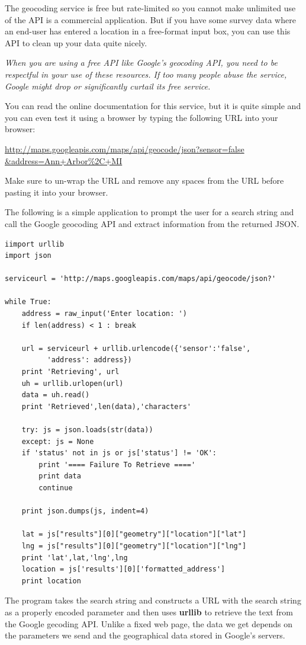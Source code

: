 \documentclass[11pt]{book}
\begin{document}
The geocoding service is free but rate-limited so you cannot make unlimited
use of the API is a commercial application.   But if you have some survey data
where an end-user has entered a location in a free-format input box, you can use
this API to clean up your data quite nicely.  

{\em When you are using a free API like Google's geocoding API, you need
to be respectful in your use of these resources.  If too many people abuse the
service, Google might drop or significantly curtail its free service.}

You can read the online documentation for this service, but it is quite simple
and you can even test it using a browser by typing the following URL into your 
browser:

\url{http://maps.googleapis.com/maps/api/geocode/json?sensor=false &address=Ann+Arbor%2C+MI}

Make sure to un-wrap the URL and remove any spaces from the URL before pasting
it into your browser.

The following is a simple application to prompt the user for a search string
and call the Google geocoding API and extract information from the returned
JSON.

\beforeverb
\begin{verbatim}
iimport urllib
import json

serviceurl = 'http://maps.googleapis.com/maps/api/geocode/json?'

while True:
    address = raw_input('Enter location: ')
    if len(address) < 1 : break

    url = serviceurl + urllib.urlencode({'sensor':'false', 
          'address': address})
    print 'Retrieving', url
    uh = urllib.urlopen(url)
    data = uh.read()
    print 'Retrieved',len(data),'characters'

    try: js = json.loads(str(data))
    except: js = None
    if 'status' not in js or js['status'] != 'OK':
        print '==== Failure To Retrieve ===='
        print data
        continue

    print json.dumps(js, indent=4)

    lat = js["results"][0]["geometry"]["location"]["lat"]
    lng = js["results"][0]["geometry"]["location"]["lng"]
    print 'lat',lat,'lng',lng
    location = js['results'][0]['formatted_address']
    print location
\end{verbatim}
\afterverb
%
The program takes the search string and constructs a URL with the
search string as a properly encoded parameter and then uses
{\bf urllib} to retrieve the text from the Google gecoding API.
Unlike a fixed web page, the data we get depends on the parameters
we send and the geographical data stored in Google's servers.
\end{document}
